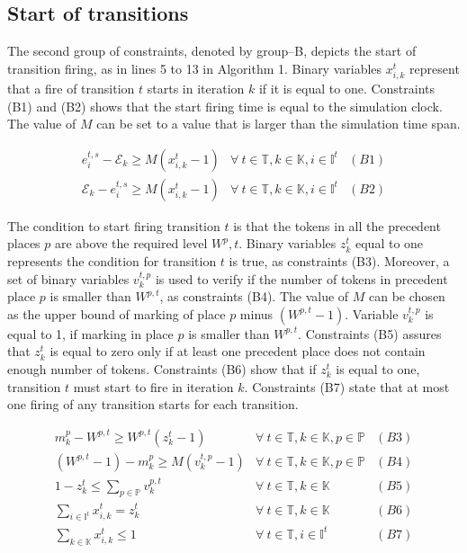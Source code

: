 \documentclass[suppldata]{interact}
\theoremstyle{plain}
\theoremstyle{definition}
\theoremstyle{remark}
\begin{document}
\subsection{Start of transitions} \label{sec:MPR_start_Firing}

The second group of constraints, denoted by group--B, depicts the start of transition firing, as in lines 5 to 13 in Algorithm 1. Binary variables $x^{t}_{i,k}$ represent that a fire of transition $t$ starts in iteration $k$ if it is equal to one. Constraints (B1) and (B2) shows that the start firing time is equal to the simulation clock. The value of $M$ can be set to a value that is larger than the simulation time span.

\begin{eqnarray}
	e^{t,s}_i-\mathcal{E}_{k} \ge M(x^{t}_{i,k}-1)& \forall\ t\in \mathbb{T},k\in \mathbb{K},i\in \mathbb{I}^{t}&(B1)\nonumber\\
	\mathcal{E}_{k} -e^{t,s}_i\ge M(x^{t}_{i,k}-1)&\forall\ t\in \mathbb{T},k\in \mathbb{K},i\in \mathbb{I}^{t}&(B2)\nonumber%
\end{eqnarray}

The condition to start firing transition $t$ is that the tokens in all the precedent places $p$ are above the required level $W^p,t$. Binary variables $z^{t}_{k}$ equal to one represents the condition for transition $t$ is true, as constraints (B3). Moreover, a set of binary variables $v^{t,p}_k$ is used to verify if the number of tokens in precedent place $p$ is smaller than $W^{p,t}$, as constraints (B4). The value of $M$ can be chosen as the upper bound of marking of place $p$ minus $(W^{p,t}-1)$. Variable $v^{t,p}_k$ is equal to 1, if marking in place $p$ is smaller than $W^{p,t}$. Constraints (B5) assures that $z^{t}_k$ is equal to zero only if at least one precedent place does not contain enough number of tokens. Constraints (B6) show that if $z^{t}_k$ is equal to one, transition $t$ must start to fire in iteration $k$. Constraints (B7) state that at most one firing of any transition starts for each transition.

\begin{eqnarray}
	m^p_k - W^{p,t} \ge W^{p,t}(z^{t}_{k}-1)&\forall\ t\in \mathbb{T},k\in \mathbb{K},p\in \mathbb{P}&(B3)\nonumber\\
	(W^{p,t}-1) - m^p_k \ge M(v^{t,p}_k-1) & \forall\ t\in \mathbb{T},k\in \mathbb{K},p\in \mathbb{P} &(B4)\nonumber\\
	1 - z^{t}_{k} \le \sum_{p\in \mathbb{P}} v^{p,t}_k&\forall\ t\in \mathbb{T},k\in \mathbb{K}&(B5)\nonumber\\
	\sum_{i\in \mathbb{I}^{t}} x^{t}_{i,k} = z^{t}_k&\forall\ t\in \mathbb{T},k\in \mathbb{K}&(B6)\nonumber\\
	\sum_{k\in \mathbb{K}} x^{t}_{i,k} \le 1& \forall\ t\in \mathbb{T},i\in \mathbb{I}^{t}&(B7)\nonumber
\end{eqnarray}
\end{document}
